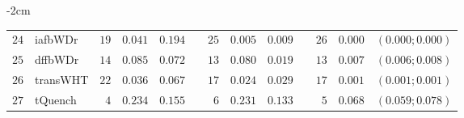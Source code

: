 \begin{table*}[!htbp]
\begin{adjustwidth*}{}{-2cm}
\begin{tabular}{@{}rlrrrrrrrrrcc@{}}
\footnotesize{$24$} & \footnotesize{iafbWDr  } & \footnotesize{$19$} & \footnotesize{$0.041$} & \footnotesize{$0.194$} && \footnotesize{$25$} & \footnotesize{$0.005$} & \footnotesize{$0.009$} && \footnotesize{$26$} & \footnotesize{$0.000$} & \footnotesize{$(0.000;0.000)$} \\
\footnotesize{$25$} & \footnotesize{dffbWDr  } & \footnotesize{$14$} & \footnotesize{$0.085$} & \footnotesize{$0.072$} && \footnotesize{$13$} & \footnotesize{$0.080$} & \footnotesize{$0.019$} && \footnotesize{$13$} & \footnotesize{$0.007$} & \footnotesize{$(0.006;0.008)$} \\
\footnotesize{$26$} & \footnotesize{transWHT } & \footnotesize{$22$} & \footnotesize{$0.036$} & \footnotesize{$0.067$} && \footnotesize{$17$} & \footnotesize{$0.024$} & \footnotesize{$0.029$} && \footnotesize{$17$} & \footnotesize{$0.001$} & \footnotesize{$(0.001;0.001)$} \\
\footnotesize{$27$} & \footnotesize{tQuench  } & \footnotesize{$4 $} & \footnotesize{$0.234$} & \footnotesize{$0.155$} && \footnotesize{$6 $} & \footnotesize{$0.231$} & \footnotesize{$0.133$} && \footnotesize{$5 $} & \footnotesize{$0.068$} & \footnotesize{$(0.059;0.078)$} \\
\bottomrule
\end{tabular}
\end{adjustwidth*}
\end{table*}

